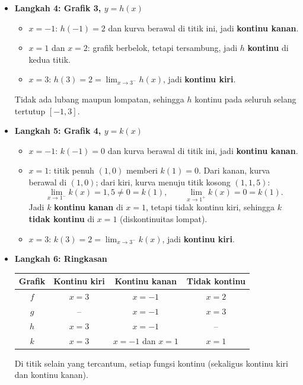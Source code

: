 \documentclass[10pt,a4paper]{article}
\begin{document}
\begin{enumerate}
\begin{itemize}
\item \textbf{Langkah 4: Grafik 3, $y = h(x)$}

\begin{itemize}
  \item $x = -1$: $h(-1) = 2$ dan kurva berawal di titik ini, jadi \textbf{kontinu kanan}.
  \item $x = 1$ dan $x = 2$: grafik berbelok, tetapi tersambung, jadi $h$ \textbf{kontinu} di kedua titik.
  \item $x = 3$: $h(3) = 2 = \lim_{x \to 3^-} h(x)$, jadi \textbf{kontinu kiri}.
\end{itemize}
Tidak ada lubang maupun lompatan, sehingga $h$ kontinu pada seluruh selang tertutup $[-1, 3]$.

\item \textbf{Langkah 5: Grafik 4, $y = k(x)$}

\begin{itemize}
  \item $x = -1$: $k(-1) = 0$ dan kurva berawal di titik ini, jadi \textbf{kontinu kanan}.
  \item $x = 1$: titik penuh $(1,0)$ memberi $k(1) = 0$. Dari kanan, kurva berawal di $(1,0)$; dari kiri, kurva menuju titik kosong $(1, 1{,}5)$:
  \[
  \lim_{x \to 1^-} k(x) = 1{,}5 \neq 0 = k(1), \qquad \lim_{x \to 1^+} k(x) = 0 = k(1).
  \]
  Jadi $k$ \textbf{kontinu kanan} di $x = 1$, tetapi tidak kontinu kiri, sehingga $k$ \textbf{tidak kontinu} di $x = 1$ (diskontinuitas lompat).
  \item $x = 3$: $k(3) = 2 = \lim_{x \to 3^-} k(x)$, jadi \textbf{kontinu kiri}.
\end{itemize}

\item \textbf{Langkah 6: Ringkasan}

\begin{center}
\begin{tabular}{c|c|c|c}
Grafik & Kontinu kiri & Kontinu kanan & Tidak kontinu \\ \hline
$f$ & $x = 3$ & $x = -1$ & $x = 2$ \\
$g$ & -- & $x = -1$ & $x = 3$ \\
$h$ & $x = 3$ & $x = -1$ & -- \\
$k$ & $x = 3$ & $x = -1$ dan $x = 1$ & $x = 1$
\end{tabular}
\end{center}
Di titik selain yang tercantum, setiap fungsi kontinu (sekaligus kontinu kiri dan kontinu kanan).
\end{itemize}

\end{enumerate}
\end{document}

